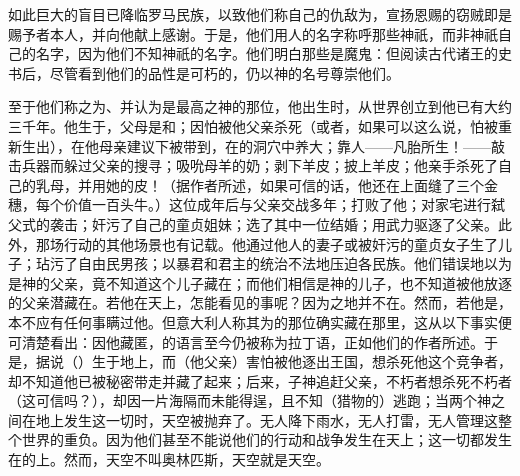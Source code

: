 如此巨大的盲目已降临罗马民族，以致他们称自己的仇敌为，宣扬恩赐的窃贼即是赐予者本人，并向他献上感谢。于是，他们用人的名字称呼那些神祇，而非神祇自己的名字，因为他们不知神祇的名字。他们明白那些是魔鬼：但阅读古代诸王的史书后，尽管看到他们的品性是可朽的，仍以神的名号尊崇他们。\par

至于他们称之为、并认为是最高之神的那位，他出生时，从世界创立到他已有大约三千年。他生于，父母是和；因怕被他父亲杀死（或者，如果可以这么说，怕被重新生出），在他母亲建议下被带到，在的洞穴中养大；靠人——凡胎所生！——敲击兵器而躲过父亲的搜寻；吸吮母羊的奶；剥下羊皮；披上羊皮；他亲手杀死了自己的乳母，并用她的皮！（据作者所述，如果可信的话，他还在上面缝了三个金穗，每个价值一百头牛。）这位成年后与父亲交战多年；打败了他；对家宅进行弑父式的袭击；奸污了自己的童贞姐妹；选了其中一位结婚；用武力驱逐了父亲。此外，那场行动的其他场景也有记载。他通过他人的妻子或被奸污的童贞女子生了儿子；玷污了自由民男孩；以暴君和君主的统治不法地压迫各民族。他们错误地以为是神的父亲，竟不知道这个儿子藏在；而他们相信是神的儿子，也不知道被他放逐的父亲潜藏在。若他在天上，怎能看见的事呢？因为之地并不在。然而，若他是，本不应有任何事瞒过他。但意大利人称其为的那位确实藏在那里，这从以下事实便可清楚看出：因他藏匿，的语言至今仍被称为拉丁语，正如他们的作者所述。于是，据说（）生于地上，而（他父亲）害怕被他逐出王国，想杀死他这个竞争者，却不知道他已被秘密带走并藏了起来；后来，子神追赶父亲，不朽者想杀死不朽者（这可信吗？），却因一片海隔而未能得逞，且不知（猎物的）逃跑；当两个神之间在地上发生这一切时，天空被抛弃了。无人降下雨水，无人打雷，无人管理这整个世界的重负。因为他们甚至不能说他们的行动和战争发生在天上；这一切都发生在的上。然而，天空不叫奥林匹斯，天空就是天空。\par

